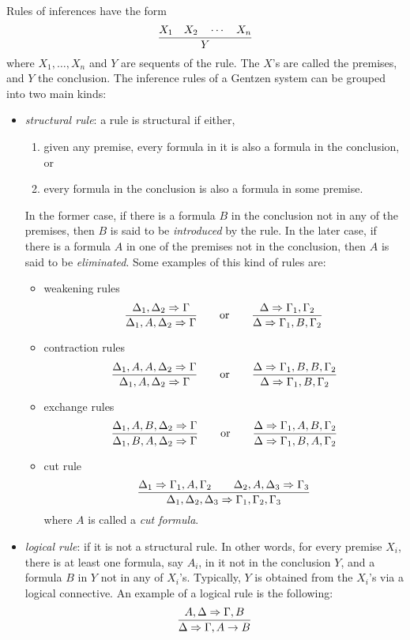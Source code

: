 \documentclass[12pt]{article}
\begin{document}
Rules of inferences have the form
$${X_1 \quad X_2 \quad \cdots \quad X_n \over Y}$$
where $X_1,\ldots,X_n$ and $Y$ are sequents of the rule.  The $X$'s are called the premises, and $Y$ the conclusion.  The inference rules of a Gentzen system can be grouped into two main kinds:
\begin{itemize}
\item \emph{structural rule}: a rule is structural if either, 
\begin{enumerate}
\item given any premise, every formula in it is also a formula in the conclusion, or 
\item every formula in the conclusion is also a formula in some premise.  
\end{enumerate}
In the former case, if there is a formula $B$ in the conclusion not in any of the premises, then $B$ is said to be \emph{introduced} by the rule.  In the later case, if there is a formula $A$ in one of the premises not in the conclusion, then $A$ is said to be \emph{eliminated}.  Some examples of this kind of rules are:
\begin{itemize}
\item weakening rules $${\Delta_1, \Delta_2 \Rightarrow \Gamma \over \Delta_1, A, \Delta_2 \Rightarrow \Gamma} \qquad \mbox{or} \qquad {\Delta \Rightarrow \Gamma_1,\Gamma_2 \over \Delta \Rightarrow \Gamma_1,B,\Gamma_2}$$
\item contraction rules $${\Delta_1, A,A,\Delta_2 \Rightarrow \Gamma \over \Delta_1, A, \Delta_2 \Rightarrow \Gamma} \qquad \mbox{or} \qquad {\Delta \Rightarrow \Gamma_1,B,B,\Gamma_2 \over \Delta \Rightarrow \Gamma_1,B,\Gamma_2}$$
\item exchange rules $${\Delta_1, A,B,\Delta_2 \Rightarrow \Gamma \over \Delta_1, B,A, \Delta_2 \Rightarrow \Gamma} \qquad \mbox{or} \qquad {\Delta \Rightarrow \Gamma_1,A,B,\Gamma_2 \over \Delta \Rightarrow \Gamma_1,B,A,\Gamma_2}$$
\item cut rule $${\Delta_1 \Rightarrow \Gamma_1, A, \Gamma_2 \qquad \Delta_2, A,\Delta_3 \Rightarrow \Gamma_3 \over \Delta_1, \Delta_2, \Delta_3 \Rightarrow \Gamma_1,\Gamma_2,\Gamma_3}$$
where $A$ is called a \emph{cut formula}.
\end{itemize}
\item \emph{logical rule}: if it is not a structural rule.  In other words, for every premise $X_i$, there is at least one formula, say $A_i$, in it not in the conclusion $Y$, and a formula $B$ in $Y$ not in any of $X_i$'s.  Typically, $Y$ is obtained from the $X_i$'s via a logical connective.  An example of a logical rule is the following:
$${A,\Delta \Rightarrow \Gamma, B \over \Delta \Rightarrow \Gamma, A\to B}$$
\end{itemize}
\end{document}
